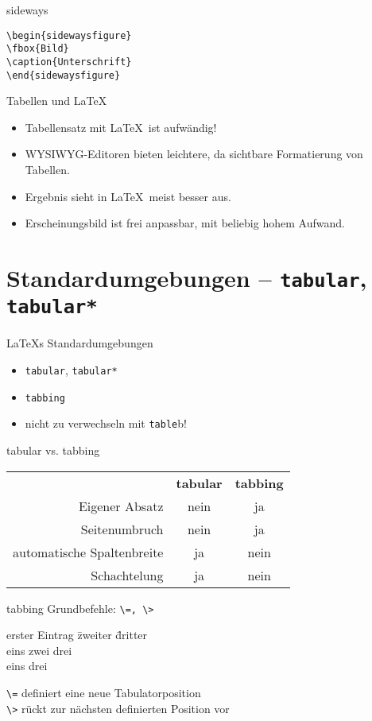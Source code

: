 \documentclass{beamer}
\begin{document}
\begin{frame}[fragile]{sideways}
\begin{lstlisting}
\begin{sidewaysfigure}
\fbox{Bild}
\caption{Unterschrift}
\end{sidewaysfigure}
\end{lstlisting}
\end{frame}

\begin{frame}{Tabellen und \LaTeX}
\begin{itemize}
\item[$\pmb-$] Tabellensatz mit \LaTeX\ ist aufwändig!
\item[$\pmb-$] WYSIWYG-Editoren bieten leichtere, da sichtbare Formatierung von Tabellen.
\item[$\pmb+$] Ergebnis sieht in \LaTeX\ meist besser aus.
\item[$\pmb+$] Erscheinungsbild ist frei anpassbar, mit beliebig hohem Aufwand.
\end{itemize}
\end{frame}

\section[tabular]{Standardumgebungen – \texttt{tabular}, \texttt{tabular*}}
\begin{frame}[fragile]{\LaTeX{}s Standardumgebungen}
\begin{itemize}
\item \verb/tabular/, \verb/tabular*/
\item \verb/tabbing/
\item \alert{nicht zu verwechseln mit \texttt{table}b!}
\end{itemize}
\end{frame}

\begin{frame}[fragile]{tabular vs. tabbing}
\begin{tabular}[]{rcc}
& \textbf{tabular} & \textbf{tabbing}\\
Eigener Absatz & nein & ja \\
Seitenumbruch & nein & ja  \\
automatische Spaltenbreite & ja & nein\\
Schachtelung & ja & nein
\end{tabular}
\end{frame}

\begin{frame}[fragile]{tabbing}
Grundbefehle: \verb|\=, \>|

\begin{LTXexample}[pos=b]
\begin{tabbing}
erster Eintrag \= zweiter \= dritter \\
eins \> zwei \> drei\\
eins \>      \> drei
\end{tabbing}
\end{LTXexample}
\verb/\=/ definiert eine neue Tabulatorposition\\
\verb/\>/ rückt zur nächsten definierten Position vor
\end{frame}
\end{document}
